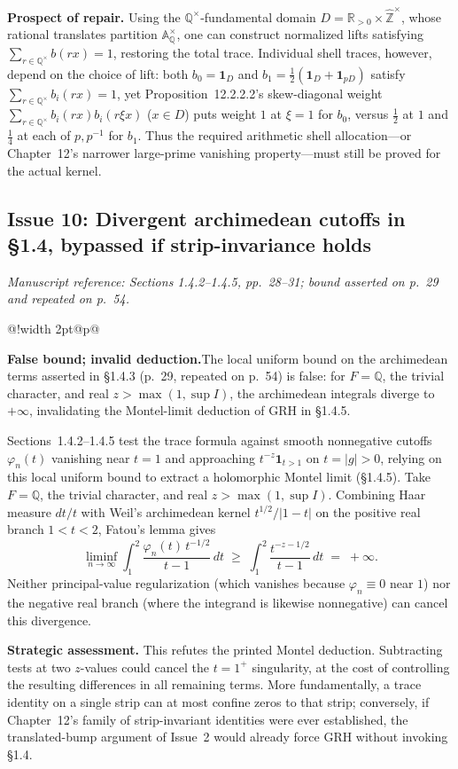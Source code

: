 \documentclass[11pt,letterpaper]{article}
\makeatletter
\newcommand{\msloc}[1]{%
  {\small\color{locgray}\itshape Manuscript reference: #1.}\par\nobreak\vspace{3pt}\@afterindentfalse\@afterheading
}
\newcommand{\issuefinding}[2]{%
  \begingroup
  \setlength{\fboxsep}{0pt}%
  \noindent\colorbox{barbg}{%
    \begin{tabular}{@{}!{\color{baraccent}\vrule width 2pt}@{\hspace{8pt}}p{\dimexpr\linewidth-18pt\relax}@{\hspace{8pt}}}
      \rule{0pt}{11.5pt}\small\textbf{\color{baraccent}#1}\enspace #2\rule[-4.5pt]{0pt}{0pt}
    \end{tabular}%
  }%
  \endgroup
  \par\nobreak\vspace{4.5pt}\@afterindentfalse\@afterheading
}
\newcommand{\Q}{\mathbb{Q}}
\newcommand{\R}{\mathbb{R}}
\newcommand{\Z}{\mathbb{Z}}
\newcommand{\A}{\mathbb{A}}
\newcommand{\Zhat}{\widehat{\Z}}
\newcommand{\dd}{\,d}
\makeatother
\begin{document}
\textbf{Prospect of repair.} Using the $\Q^\times$-fundamental domain $D = \R_{>0}\times\Zhat^\times$, whose rational translates partition $\A_\Q^\times$, one can construct normalized lifts satisfying $\sum_{r\in\Q^\times} b(rx)=1$, restoring the total trace. Individual shell traces, however, depend on the choice of lift: both $b_0=\mathbf{1}_D$ and $b_1=\tfrac{1}{2}(\mathbf{1}_D + \mathbf{1}_{pD})$ satisfy $\sum_{r\in\Q^\times} b_i(rx)=1$, yet Proposition~12.2.2.2's skew-diagonal weight $\sum_{r\in\Q^\times} b_i(rx)b_i(r\xi x)$ ($x\in D$) puts weight $1$ at $\xi=1$ for $b_0$, versus $\tfrac{1}{2}$ at $1$ and $\tfrac{1}{4}$ at each of $p,p^{-1}$ for $b_1$. Thus the required arithmetic shell allocation---or Chapter~12's narrower large-prime vanishing property---must still be proved for the actual kernel.

\subsection{Issue 10: Divergent archimedean cutoffs in \texorpdfstring{\S1.4}{Section 1.4}, bypassed if strip-invariance holds}
\msloc{Sections 1.4.2--1.4.5, pp.~28--31; bound asserted on p.~29 and repeated on p.~54}
\issuefinding{False bound; invalid deduction.}{The local uniform bound on the archimedean terms asserted in \S1.4.3 (p.~29, repeated on p.~54) is false: for $F=\Q$, the trivial character, and real $z>\max(1,\sup I)$, the archimedean integrals diverge to $+\infty$, invalidating the Montel-limit deduction of GRH in \S1.4.5.}

Sections~1.4.2--1.4.5 test the trace formula against smooth nonnegative cutoffs $\varphi_n(t)$ vanishing near $t=1$ and approaching $t^{-z}\mathbf{1}_{t>1}$ on $t=|g|>0$, relying on this local uniform bound to extract a holomorphic Montel limit (\S1.4.5). Take $F=\Q$, the trivial character, and real $z > \max(1,\sup I)$. Combining Haar measure $dt/t$ with Weil's archimedean kernel $t^{1/2}/|1-t|$ on the positive real branch $1<t<2$, Fatou's lemma gives
\[
  \liminf_{n\to\infty}\int_1^2 \frac{\varphi_n(t)\,t^{-1/2}}{t-1}\dd t
  \;\ge\; \int_1^2 \frac{t^{-z-1/2}}{t-1}\dd t \;=\; +\infty.
\]
Neither principal-value regularization (which vanishes because $\varphi_n\equiv 0$ near $1$) nor the negative real branch (where the integrand is likewise nonnegative) can cancel this divergence.

\textbf{Strategic assessment.} This refutes the printed Montel deduction. Subtracting tests at two $z$-values could cancel the $t=1^+$ singularity, at the cost of controlling the resulting differences in all remaining terms. More fundamentally, a trace identity on a single strip can at most confine zeros to that strip; conversely, if Chapter~12's family of strip-invariant identities were ever established, the translated-bump argument of Issue~2 would already force GRH without invoking \S1.4.
\end{document}
